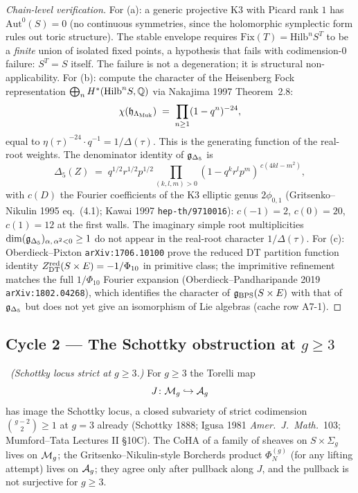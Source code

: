 \begin{proof}[Chain-level verification]
For (a): a generic projective K$3$ with Picard rank $1$ has
$\mathrm{Aut}^0(S) = 0$ (no continuous symmetries, since the
holomorphic symplectic form rules out toric structure). The
stable envelope requires $\mathrm{Fix}(T) = \mathrm{Hilb}^n S^T$
to be a \emph{finite} union of isolated fixed points, a hypothesis
that fails with codimension-$0$ failure: $S^T = S$ itself. The
failure is not a degeneration; it is structural non-applicability.
For (b): compute the character of the Heisenberg Fock representation
$\bigoplus_n H^*(\mathrm{Hilb}^n S, \mathbb{Q})$ via Nakajima 1997 Theorem~2.8:
\[
  \chi(\mathfrak{h}_{\Lambda_{\mathrm{Muk}}}) \;=\; \prod_{n \geq 1} (1 - q^n)^{-24},
\]
equal to $\eta(\tau)^{-24} \cdot q^{-1} = 1/\Delta(\tau)$.
This is the generating function of the real-root weights. The
denominator identity of $\mathfrak{g}_{\Delta_5}$ is
\[
  \Delta_5(Z) \;=\; q^{1/2} r^{1/2} p^{1/2}
  \prod_{(k, l, m) > 0}\!\!
  (1 - q^k r^l p^m)^{\,c(4kl - m^2)},
\]
with $c(D)$ the Fourier coefficients of the K$3$ elliptic genus
$2\phi_{0,1}$ (Gritsenko--Nikulin 1995 eq.~(4.1); Kawai 1997
\texttt{hep-th/9710016}): $c(-1) = 2$, $c(0) = 20$, $c(1) = 12$
at the first walls. The imaginary simple root multiplicities
$\dim(\mathfrak{g}_{\Delta_5})_{\alpha,\,\alpha^2 < 0} \geq 1$ do not
appear in the real-root character $1/\Delta(\tau)$.
For (c): Oberdieck--Pixton \texttt{arXiv:1706.10100} prove the
reduced DT partition function identity
$Z^{\mathrm{red}}_{\mathrm{DT}}(S \times E) = -1/\Phi_{10}$ in primitive
class; the imprimitive refinement matches the full $1/\Phi_{10}$
Fourier expansion (Oberdieck--Pandharipande 2019
\texttt{arXiv:1802.04268}), which identifies the character of
$\mathfrak{g}_{\mathrm{BPS}}(S \times E)$ with that of $\mathfrak{g}_{\Delta_5}$ but
does not yet give an isomorphism of Lie algebras (cache row A7-1).
\end{proof}

\subsection{Cycle 2 --- The Schottky obstruction at $g \geq 3$}

\ClaimStatusTheorem\ \emph{(Schottky locus strict at $g \geq 3$.)}
For $g \geq 3$ the Torelli map
\[
  J \colon \mathcal{M}_g \hookrightarrow \mathcal{A}_g
\]
has image the Schottky locus, a closed subvariety of strict codimension
$\binom{g-2}{2} \geq 1$ at $g = 3$ already (Schottky 1888; Igusa 1981
\emph{Amer.\ J.\ Math.}\ 103; Mumford--Tata Lectures II \S10C). The
CoHA of a family of sheaves on $S \times \Sigma_g$ lives on $\mathcal{M}_g$;
the Gritsenko--Nikulin-style Borcherds product $\Phi_N^{(g)}$ (for any
lifting attempt) lives on $\mathcal{A}_g$; they agree only after pullback along
$J$, and the pullback is not surjective for $g \geq 3$.

